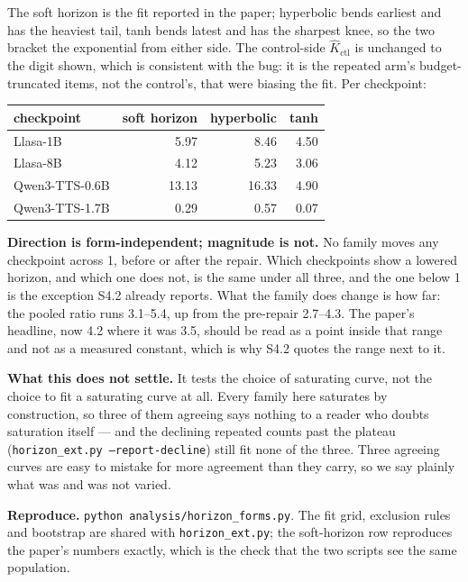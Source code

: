 \documentclass[11pt]{article}
\begin{document}
\noindent The soft horizon is the fit reported in the paper; hyperbolic bends
earliest and has the heaviest tail, tanh bends latest and has the sharpest knee,
so the two bracket the exponential from either side. The control-side $\hat
K_{\mathrm{ctl}}$ is unchanged to the digit shown, which is consistent with the
bug: it is the repeated arm's budget-truncated items, not the control's, that
were biasing the fit. Per checkpoint:

\begin{center}
\begin{tabular}{lrrr}
\toprule
checkpoint & soft horizon & hyperbolic & tanh \\
\midrule
Llasa-1B        &  5.97 &  8.46 & 4.50 \\
Llasa-8B        &  4.12 &  5.23 & 3.06 \\
Qwen3-TTS-0.6B  & 13.13 & 16.33 & 4.90 \\
Qwen3-TTS-1.7B  &  0.29 &  0.57 & 0.07 \\
\bottomrule
\end{tabular}
\end{center}

\noindent \textbf{Direction is form-independent; magnitude is not.} No family
moves any checkpoint across 1, before or after the repair. Which checkpoints show
a lowered horizon, and which one does not, is the same under all three, and the
one below 1 is the exception S4.2 already reports. What the family does change is
how far: the pooled ratio runs 3.1--5.4, up from the pre-repair 2.7--4.3. The
paper's headline, now 4.2 where it was 3.5, should be read as a point inside that
range and not as a measured constant, which is why S4.2 quotes the range next to
it.

\noindent\textbf{What this does not settle.} It tests the choice of saturating
curve, not the choice to fit a saturating curve at all. Every family here
saturates by construction, so three of them agreeing says nothing to a reader who
doubts saturation itself --- and the declining repeated counts past the plateau
(\texttt{horizon\_ext.py --report-decline}) still fit none of the three. Three
agreeing curves are easy to mistake for more agreement than they carry, so we say
plainly what was and was not varied.

\noindent\textbf{Reproduce.} \texttt{python analysis/horizon\_forms.py}. The fit
grid, exclusion rules and bootstrap are shared with \texttt{horizon\_ext.py}; the
soft-horizon row reproduces the paper's numbers exactly, which is the check that
the two scripts see the same population.
\end{document}
